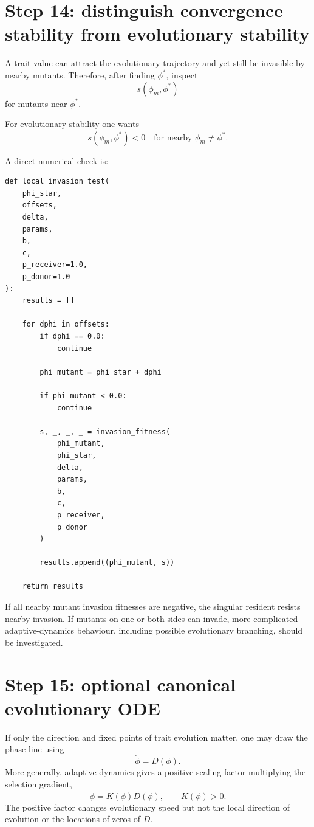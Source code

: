 \documentclass[11pt]{article}
\begin{document}
\section{Step 14: distinguish convergence stability from evolutionary stability}

A trait value can attract the evolutionary trajectory and yet still be invasible by nearby mutants. Therefore, after finding $\phi^*$, inspect
\[
s(\phi_m,\phi^*)
\]
for mutants near $\phi^*$.

For evolutionary stability one wants
\[
\boxed{
 s(\phi_m,\phi^*)<0
 \quad\text{for nearby }\phi_m\neq\phi^*.
}
\]

A direct numerical check is:

\begin{lstlisting}
def local_invasion_test(
    phi_star,
    offsets,
    delta,
    params,
    b,
    c,
    p_receiver=1.0,
    p_donor=1.0
):
    results = []

    for dphi in offsets:
        if dphi == 0.0:
            continue

        phi_mutant = phi_star + dphi

        if phi_mutant < 0.0:
            continue

        s, _, _, _ = invasion_fitness(
            phi_mutant,
            phi_star,
            delta,
            params,
            b,
            c,
            p_receiver,
            p_donor
        )

        results.append((phi_mutant, s))

    return results
\end{lstlisting}

If all nearby mutant invasion fitnesses are negative, the singular resident resists nearby invasion. If mutants on one or both sides can invade, more complicated adaptive-dynamics behaviour, including possible evolutionary branching, should be investigated.

\section{Step 15: optional canonical evolutionary ODE}

If only the direction and fixed points of trait evolution matter, one may draw the phase line using
\[
\boxed{
\dot\phi=D(\phi).
}
\]
More generally, adaptive dynamics gives a positive scaling factor multiplying the selection gradient,
\[
\dot\phi=K(\phi)D(\phi),
\qquad K(\phi)>0.
\]
The positive factor changes evolutionary speed but not the local direction of evolution or the locations of zeros of $D$.
\end{document}
